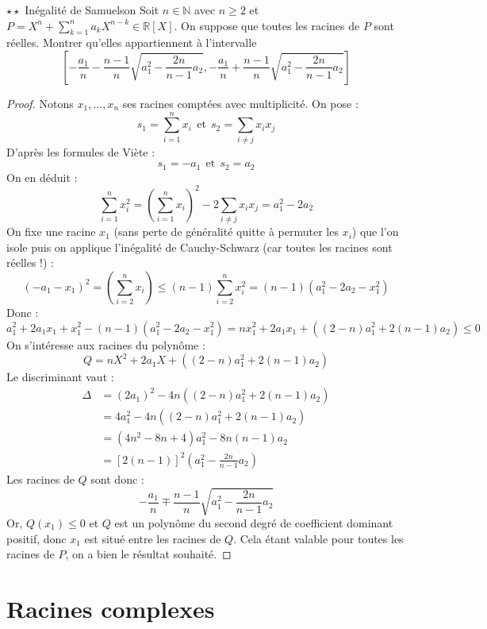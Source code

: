 \documentclass[french,a4paper]{article}
\newcommand{\N}{\mathbb{N}}
\newcommand{\R}{\mathbb{R}}
\theoremstyle{plain}
\theoremstyle{definition}
\theoremstyle{remark}
\begin{document}
\begin{ex}{$\star\star$ Inégalité de Samuelson}
	Soit $n\in\N$ avec $n\geqslant 2$ et $P=\displaystyle X^n+\sum_{k=1}^{n}a_kX^{n-k}\in\R[X]$. On suppose que toutes les racines de $P$ sont réelles. Montrer qu'elles appartiennent à l'intervalle $$\left[-\frac{a_1}{n}-\frac{n-1}{n}\sqrt{a_1^2-\frac{2n}{n-1}a_2},-\frac{a_1}{n}+\frac{n-1}{n}\sqrt{a_1^2-\frac{2n}{n-1}a_2}\right]$$
\end{ex}
\begin{proof}
	Notons $x_1,\ldots,x_n$ ses racines comptées avec multiplicité. On pose : $$s_1=\sum_{i=1}^{n}x_i\ \ \text{et}\ \ s_2=\sum_{i\ne j}x_ix_j$$ D'après les formules de Viète : $$s_1=-a_1\ \ \text{et}\ \ s_2=a_2$$ On en déduit : $$\sum_{i=1}^{n}x_i^2=\left(\sum_{i=1}^{n}x_i\right)^2-2\sum_{i\ne j}x_ix_j=a_1^2-2a_2$$ On fixe une racine $x_1$ (sans perte de généralité quitte à permuter les $x_i$) que l'on isole puis on applique l'inégalité de Cauchy-Schwarz (car toutes les racines sont réelles !) : $$(-a_1-x_1)^2=\left(\sum_{i=2}^{n}x_i\right)\leqslant(n-1)\sum_{i=2}^{n}x_i^2=(n-1)(a_1^2-2a_2-x_1^2)$$
	Donc : $$a_1^2+2a_1x_1+x_1^2-(n-1)(a_1^2-2a_2-x_1^2)=nx_1^2+2a_1x_1+((2-n)a_1^2+2(n-1)a_2)\leqslant 0$$ On s'intéresse aux racines du polynôme : $$Q=nX^2+2a_1X+((2-n)a_1^2+2(n-1)a_2)$$ Le discriminant vaut :
	\begin{align*}
		\Delta&=(2a_1)^2-4n((2-n)a_1^2+2(n-1)a_2)\\
		&=4a_1^2-4n((2-n)a_1^2+2(n-1)a_2)\\
		&=(4n^2-8n+4)a_1^2-8n(n-1)a_2\\
		&=[2(n-1)]^2\left(a_1^2-\frac{2n}{n-1}a_2\right)
	\end{align*}
	Les racines de $Q$ sont donc : $$-\frac{a_1}{n}\mp\frac{n-1}{n}\sqrt{a_1^2-\frac{2n}{n-1}a_2}$$ Or, $Q(x_1)\leqslant 0$ et $Q$ est un polynôme du second degré de coefficient dominant positif, donc $x_1$ est situé entre les racines de $Q$. Cela étant valable pour toutes les racines de $P$, on a bien le résultat souhaité.
\end{proof}

\section{Racines complexes}
\end{document}
